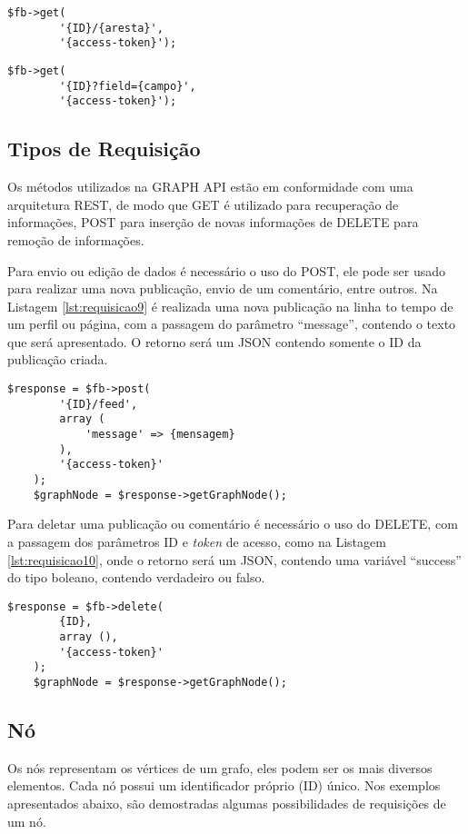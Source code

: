 \begin{lstlisting}[caption={Requisição com o uso do ID+aresta},label={lst:requisicoes2}]
	$fb->get(
    	'{ID}/{aresta}',
    	'{access-token}');
\end{lstlisting}

\begin{lstlisting}[caption={Requisição com o uso do ID+campo},label={lst:requisicoes3}]
	$fb->get(
		'{ID}?field={campo}',
   		'{access-token}');
\end{lstlisting}

\subsection{Tipos de Requisição}
Os métodos utilizados na GRAPH API estão em conformidade com uma arquitetura REST, de modo que GET é utilizado para recuperação de informações, POST para inserção de novas informações de DELETE para remoção de informações.

Para envio ou edição de dados é necessário o uso do POST, ele pode ser usado para realizar uma nova publicação, envio de um comentário, entre outros. Na Listagem \ref{lst:requisicao9} é realizada uma nova publicação na linha to tempo de um perfil ou página, com a passagem do parâmetro ``message'', contendo o texto que será apresentado. O retorno será um JSON contendo somente o ID da publicação criada.

\begin{lstlisting}[caption={Requisição POST},label={lst:requisicao9}]
	$response = $fb->post(
   		'{ID}/feed',
    	array (
      		'message' => {mensagem}
    	),
    	'{access-token}'
  	);
	$graphNode = $response->getGraphNode();
\end{lstlisting}

Para deletar uma publicação ou comentário é necessário o uso do DELETE, com a passagem dos parâmetros ID e \textit{token} de acesso, como na Listagem \ref{lst:requisicao10}, onde o retorno será um JSON, contendo uma variável ``success'' do tipo boleano, contendo verdadeiro ou falso.

\begin{lstlisting}[caption={Requisição DELETE},label={lst:requisicao10}]
	$response = $fb->delete(
    	{ID},
   		array (),
    	'{access-token}'
  	);
	$graphNode = $response->getGraphNode();
\end{lstlisting}

\subsection{Nó}
Os nós representam os vértices de um grafo, eles podem ser os mais diversos elementos. Cada nó possui um identificador próprio (ID) único. Nos exemplos apresentados abaixo, são demostradas algumas possibilidades de requisições de um nó.

